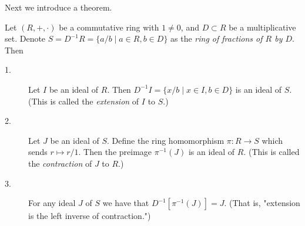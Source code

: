     Next we introduce a theorem. 
    \begin{thm}
        Let $(R, +, \cdot)$ be a commutative ring with $1 \ne 0$, and $D
        \subset R$ be a multiplicative set. Denote $S = D^{-1}R = \{a/b
        \mid a \in R, b \in D\}$ as the \textit{ring of fractions of $R$
        by $D$}. Then 
        \begin{description}
            \item[1.] Let $I$ be an ideal of $R$. Then $D^{-1}I =\{x/b
            \mid x \in I, b \in D\}$ is an ideal of $S$. (This is called
            the \textit{extension} of $I$ to $S$.)
    
            \item[2.] Let $J$ be an ideal of $S$. Define the ring
            homomorphism $\pi: R \to S$ which sends $r \mapsto r/1$. Then
            the preimage $\pi^{-1}(J)$ is an ideal of $R$. (This is
            called the \textit{contraction} of $J$ to $R$.)
    
            \item[3.] For any ideal $J$ of $S$ we have that $D^{-1}[\pi^{-1}(J)] = J$.
            (That is, "extension is the left inverse of
            contraction.")
        \end{description}
    \end{thm}


